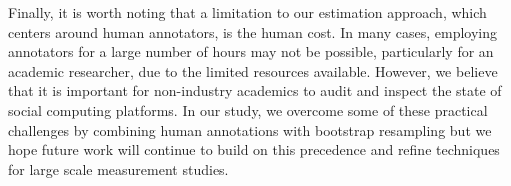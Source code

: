 Finally, it is worth noting that a limitation to our estimation approach, which centers around human annotators, is the human cost. In many cases, employing annotators for a large number of hours may not be possible, particularly for an academic researcher, due to the limited resources available. However, we believe that it is important for non-industry academics to audit and inspect the state of social computing platforms. In our study, we overcome some of these practical challenges by combining human annotations with bootstrap resampling but we hope future work will continue to build on this precedence and refine techniques for large scale measurement studies.
